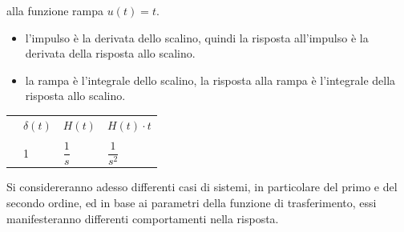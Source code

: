\documentclass[10pt, letterpaper]{report}
\begin{document}
alla funzione rampa $u(t)=t$. \begin{itemize}
    \item l'impulso è la derivata dello scalino, quindi la risposta all'impulso è la derivata 
della risposta allo scalino. 
\item la rampa è l'integrale dello scalino, la risposta alla rampa è l'integrale della risposta allo 
scalino.
\end{itemize}\begin{center}
    \begin{tabular}{llll}
        \rowcolor[HTML]{DAE8FC} 
        \multicolumn{1}{l|}{\cellcolor[HTML]{DAE8FC}funzione}    & \multicolumn{1}{l|}{\cellcolor[HTML]{DAE8FC}$\delta(t)$} & \multicolumn{1}{l|}{\cellcolor[HTML]{DAE8FC}$H(t)$}         & $H(t)\cdot t$    \\
                                                                 &                                                          &                                                             &                  \\
        \rowcolor[HTML]{FFFFC7} 
        \multicolumn{1}{l|}{\cellcolor[HTML]{FFFFC7}trasformata} & \multicolumn{1}{l|}{\cellcolor[HTML]{FFFFC7}1}           & \multicolumn{1}{l|}{\cellcolor[HTML]{FFFFC7}$\dfrac{1}{s}$} & $\dfrac{1}{s^2}$
        \end{tabular}
\end{center}
Si considereranno adesso differenti casi di sistemi, in particolare del 
primo e del secondo ordine, ed in base ai parametri della funzione di trasferimento, essi 
manifesteranno differenti comportamenti nella risposta. 
\end{document}

